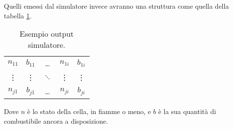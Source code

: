 \documentclass[draft]{article}
\newcommand{\eng}[1]{\foreignlanguage{english}{#1}} %
\newcommand{\file}{\textit{file}}
\begin{document}
Quelli emessi dal simulatore invece avranno una struttura come quella della
tabella \ref{tab:output}.

\begin{table}
\centering
\begin{tabular}{|c|c|c|c|c|}
	\hline
	$n_{11}$ & $b_{11}$ & \dots & $n_{1i}$ & $b_{1i}$\\
	\vdots & \vdots & $\ddots$ & \vdots & \vdots\\
	$n_{j1}$ & $b_{j1}$ & \dots & $n_{ji}$ & $b_{ji}$\\
	\hline
\end{tabular}
\caption{Esempio \eng{output} simulatore.}
\label{tab:output}
\end{table}

Dove $n$ è lo stato della cella, in fiamme o meno, e $b$ è la sua quantità di
combustibile ancora a disposizione.
\fi

\iffalse %
I dati saranno quindi presi in \eng{input} da tre \file\ CSV: uno per i dati
geografici, uno per quelli meteorologici e uno per lo stato iniziale
dell'incendio. Ognuno di questi file sarà corredato da un'altro CSV che ne
conterrà le informazioni sulla ``grana''.

Per permettere l'aggiornamento di questi dati durante la simulazione il
simulatore monitorerà la presenza di \file\ con nomi come \texttt{land.csv},
\texttt{meteo.csv} e \texttt{fire.csv}. Nel caso in cui uno di questi file sia
presente, dopo l'inizio della simulazione il simulatore provvederà a leggerli,
aggiornare il suo stato interno e cambiargli nome\footnote{con nomi tipo
\texttt{land\_<timestamp>.csv}} (o eliminarli) per evitare di rileggerli in
futuro.

Un implementazione ingenua della scrittura di questi file per l'aggiornamento
dei dati potrebbe generare una \eng{race-condition}, ovvero la lettura di
incompletidati, dato che la scrittura in un file non è atomica. Per evirate ciò
una strateggia potrebbe essere quella di scrivere i dati in file con nomi tipo
\texttt{tmpXXX} e una volta finito di scriverli si può usare \texttt{rename(2)},
che è atomica, per dargli il nome giusto. Questo metodo sarà anche usata per la
scrittura dei file.
\fi
\end{document}
